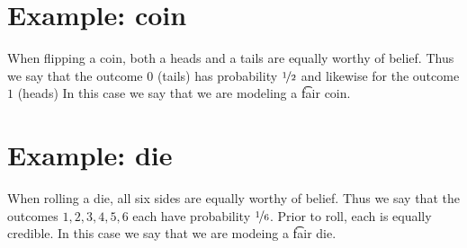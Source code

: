 \section*{Example: coin}

When flipping a coin, both a heads and a tails are equally worthy of belief.
Thus we say that the outcome $0$ (tails) has probability $\nicefrac{1}{2}$ and likewise for the outcome $1$ (heads)
In this case we say that we are modeling a \t{fair coin}.

\section*{Example: die}

When rolling a die, all six sides are equally worthy of belief.
Thus we say that the outcomes $1, 2, 3, 4, 5, 6$ each have probability $\nicefrac{1}{6}$.
Prior to roll, each is equally credible.
In this case we say that we are modeing a \t{fair die}.
